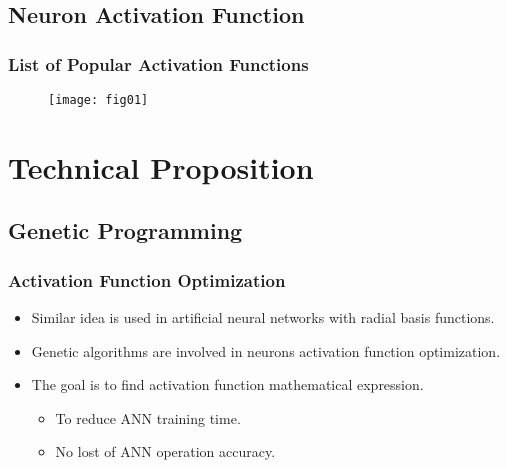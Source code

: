 \documentclass{beamer}
\begin{document}
\subsection{Neuron Activation Function}

\begin{frame}
\frametitle{List of Popular Activation Functions}
\begin{figure}[h]
  \centering
  \texttt{[image: fig01]}
\label{fig:01}
\end{figure}
\end{frame}

\section{Technical Proposition}

\subsection{Genetic Programming}

\begin{frame}
\frametitle{Activation Function Optimization}
\begin{itemize}
  \item Similar idea is used in artificial neural networks with radial basis functions.
  \item Genetic algorithms are involved in neurons activation function optimization.
  \item The goal is to find activation function mathematical expression. 
  \begin{itemize}
    \item To reduce ANN training time. 
    \item No lost of ANN operation accuracy.
  \end{itemize}
\end{itemize}
\end{frame}
\end{document}
